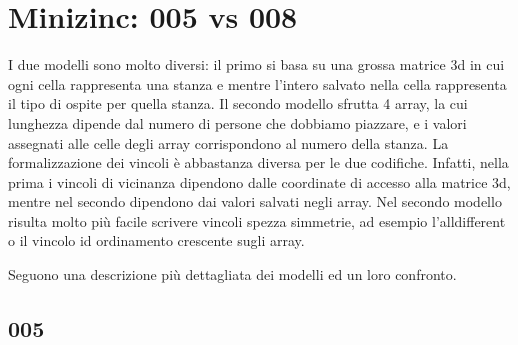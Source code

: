 
\section{Minizinc: 005 vs 008}
\noindent
I due modelli sono molto diversi:
il primo si basa su una grossa matrice 3d in cui ogni cella rappresenta una stanza e mentre l'intero salvato nella cella rappresenta il tipo di ospite per quella stanza.
Il secondo modello sfrutta 4 array, la cui lunghezza dipende dal numero di persone che dobbiamo piazzare, e i valori assegnati alle celle degli array corrispondono al numero della stanza.
La formalizzazione dei vincoli è abbastanza diversa per le due codifiche.
Infatti, nella prima i vincoli di vicinanza dipendono dalle coordinate di accesso alla matrice 3d, mentre nel secondo dipendono dai valori salvati negli array.
Nel secondo modello risulta molto più facile scrivere vincoli spezza simmetrie, ad esempio l'alldifferent o il vincolo id ordinamento crescente sugli array.

Seguono una descrizione più dettagliata dei modelli ed un loro confronto.

\subsection{005}




